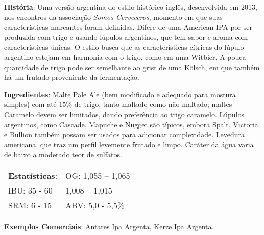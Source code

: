 \textbf{História}: Uma versão argentina do estilo histórico inglês, desenvolvida em 2013, nos encontros da associação \textit{Somos Cerveceros}, momento em que suas características marcantes foram definidas. Difere de uma American IPA por ser produzida com trigo e usando lúpulos argentinos, que tem sabor e aroma com características únicas. O estilo busca que as características cítricas do lúpulo argentino estejam em harmonia com o trigo, como em uma Witbier. A pouca quantidade de trigo pode ser semelhante ao grist de uma Kölsch, em que também há um frutado proveniente da fermentação.

\textbf{Ingredientes}: Malte Pale Ale (bem modificado e adequado para mostura simples) com até 15\% de trigo, tanto maltado como não maltado; maltes Caramelo devem ser limitados, dando preferência ao trigo caramelo. Lúpulos argentinos, como Cascade, Mapuche e Nugget são típicos, embora Spalt, Victoria e Bullion também possam ser usados para adicionar complexidade. Levedura americana, que traz um perfil levemente frutado e limpo. Caráter da água varia de baixo a moderado teor de sulfatos.

\begin{tabular}{@{}p{35mm}p{35mm}@{}}
  \textbf{Estatísticas}: & OG: 1,055 – 1,065 \\
  IBU: 35 - 60 & 1,008 – 1,015 \\
  SRM: 6 - 15 & ABV: 5,0 - 5,5\%
\end{tabular}

\textbf{Exemplos Comerciais}: Antares Ipa Argenta, Kerze Ipa Argenta.

